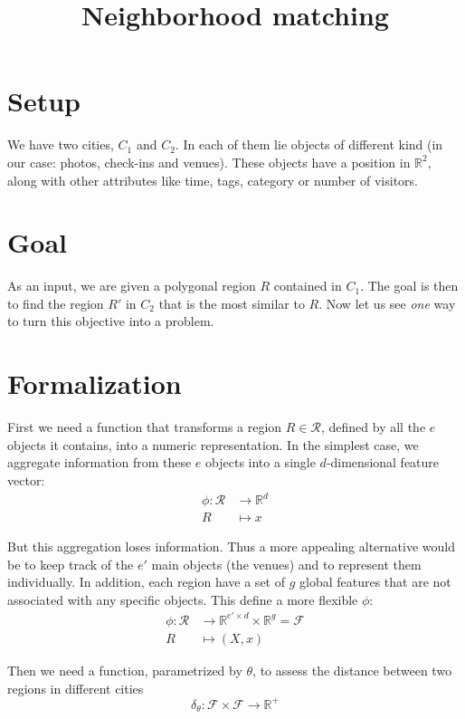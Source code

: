 \documentclass[a4paper,11pt,draft]{scrartcl}
\title{Neighborhood matching}
\begin{document}
\maketitle
\section*{Setup}
We have two cities, $C_1$ and $C_2$. In each of them lie objects of different
kind (in our case: photos, check-ins and venues). These objects have a
position in $\mathbb{R}^2$, along with other attributes like time, tags,
category or number of visitors.

\section*{Goal}
As an input, we are given a polygonal region $R$ contained in $C_1$.
The goal is then to find the region $R'$ in $C_2$ that is the most similar to
$R$.
Now let us see \emph{one} way to turn this objective into a problem.

\section*{Formalization}

First we need a function that transforms a region $R \in \mathcal{R}$, defined
by all the $e$ objects it contains, into a numeric representation. In the
simplest case, we aggregate information from these $e$ objects into a single
$d$-dimensional feature vector:
\begin{align*}
	\phi \colon \mathcal{R} &\to \mathbb{R}^d \\
	R &\mapsto x
\end{align*}

But this aggregation loses information. Thus a more appealing alternative
would be to keep track of the $e'$ main objects (the venues) and to represent
them individually. In addition, each region have a set of $g$ global features
that are not associated with any specific objects. This define a more flexible
$\phi$:
\begin{align*}
	\phi \colon \mathcal{R} &\to
	\mathbb{R}^{e'\times d} \times \mathbb{R}^g = \mathcal{F} \\
	R &\mapsto (X, x)
\end{align*}

Then we need a function, parametrized by $\theta$, to assess the distance
between two regions in different cities
\[
	\delta_{\theta} \colon \mathcal{F} \times \mathcal{F} \to \mathbb{R}^+
\]
\end{document}
